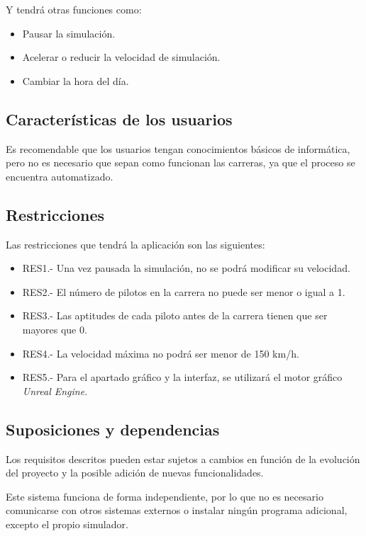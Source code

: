 Y tendrá otras funciones como:

\begin{itemize}
    \item Pausar la simulación.
    \item Acelerar o reducir la velocidad de simulación.
    \item Cambiar la hora del día.
\end{itemize}

\subsection{Características de los usuarios}

Es recomendable que los usuarios tengan conocimientos básicos de informática, pero no es necesario que sepan como funcionan las carreras, ya que el proceso se encuentra automatizado. 

\subsection{Restricciones}

Las restricciones que tendrá la aplicación son las siguientes:

\begin{itemize}
    \item RES1.- Una vez pausada la simulación, no se podrá modificar su velocidad.
    \item RES2.- El número de pilotos en la carrera no puede ser menor o igual a 1.
    \item RES3.- Las aptitudes de cada piloto antes de la carrera tienen que ser mayores que 0.
    \item RES4.- La velocidad máxima no podrá ser menor de 150 km/h.
    \item RES5.- Para el apartado gráfico y la interfaz, se utilizará el motor gráfico \textit{Unreal Engine}.
\end{itemize}

\subsection{Suposiciones y dependencias}

Los requisitos descritos pueden estar sujetos a cambios en función de la evolución del proyecto y la posible adición de nuevas funcionalidades. 

\bigskip

Este sistema funciona de forma independiente, por lo que no es necesario comunicarse con otros sistemas externos o instalar ningún programa adicional, excepto el propio simulador.

